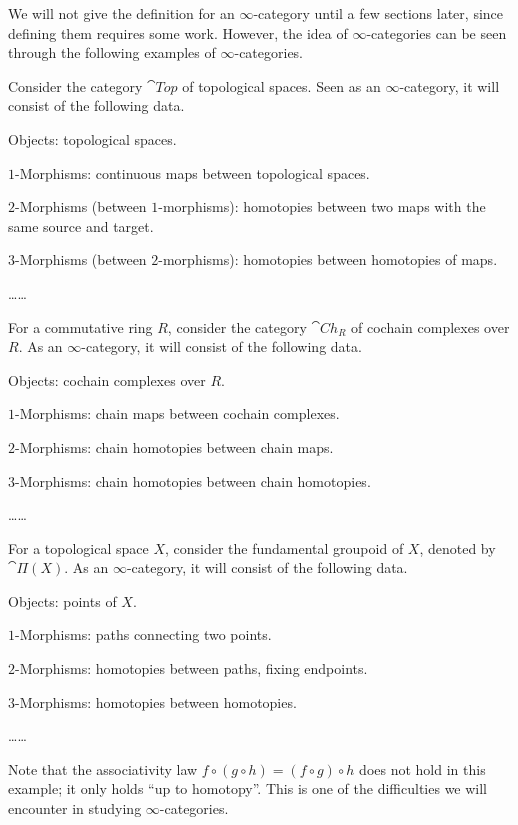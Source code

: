 We will not give the definition for an $\infty$-category
until a few sections later, since defining them requires some work.
However, the idea of $\infty$-categories
can be seen through the following examples of $\infty$-categories.

\begin{example} \label{eg-1-top}
    Consider the category $\cat{Top}$ of topological spaces.
    Seen as an $\infty$-category, it will consist of the following data.
    \begin{itms}
        \item Objects: topological spaces.
        \item $1$-Morphisms: continuous maps between topological spaces.
        \item $2$-Morphisms (between $1$-morphisms): homotopies between two maps
        with the same source and target.
        \item $3$-Morphisms (between $2$-morphisms): homotopies between homotopies of maps.
        \item \dots\dots \varqed
    \end{itms}
\end{example}

\begin{example}
    For a commutative ring $R$, consider the category $\cat{Ch}_R$ of cochain complexes over $R$.
    As an $\infty$-category, it will consist of the following data.
    \begin{itms}
        \item Objects: cochain complexes over $R$.
        \item $1$-Morphisms: chain maps between cochain complexes.
        \item $2$-Morphisms: chain homotopies between chain maps.
        \item $3$-Morphisms: chain homotopies between chain homotopies.
        \item \dots\dots \varqed
    \end{itms}
\end{example}

\begin{example}
    For a topological space $X$, consider the fundamental groupoid of $X$, denoted by $\cat{Π}(X)$.
    As an $\infty$-category, it will consist of the following data.
    \begin{itms}
        \item Objects: points of $X$.
        \item $1$-Morphisms: paths connecting two points.
        \item $2$-Morphisms: homotopies between paths, fixing endpoints.
        \item $3$-Morphisms: homotopies between homotopies.
        \item \dots\dots
    \end{itms}
    Note that the associativity law $f\circ(g\circ h)=(f\circ g)\circ h$
    does not hold in this example; it only holds ``up to homotopy''.
    This is one of the difficulties we will encounter in studying $\infty$-categories.
    \varqed
\end{example}

